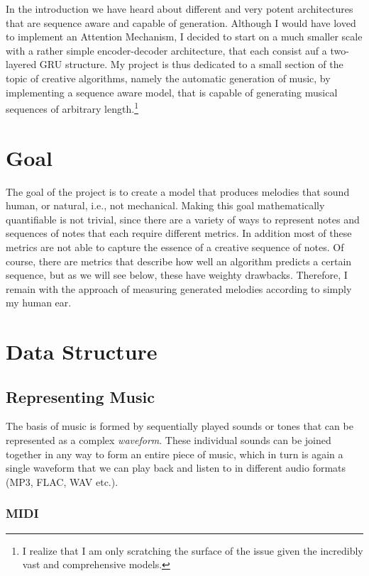 \documentclass[a4paper, 10pt, xcolor=dvipsnames]{article} %
\begin{document}
In the introduction we have heard about different and very potent architectures
that are sequence aware and capable of generation. Although I would have loved
to implement an Attention Mechanism, I decided to start on a much smaller scale
with a rather simple encoder-decoder architecture, that each consist auf a
two-layered GRU structure. My project is thus dedicated to a small section of
the topic of creative algorithms, namely the automatic generation of music, by
implementing a sequence aware model, that is capable of generating musical
sequences of arbitrary length.\footnote{I realize that I am only scratching the
  surface of the issue given the incredibly vast and comprehensive models.}


\section{Goal}
The goal of the project is to create a model that produces melodies that sound
human, or natural, i.e., not mechanical. Making this goal mathematically
quantifiable is not trivial, since there are a variety of ways to represent
notes and sequences of notes that each require different metrics. In addition
most of these metrics are not able to capture the essence of a creative
sequence of notes. Of course, there are metrics that describe how well an
algorithm predicts a certain sequence, but as we will see below, these have
weighty drawbacks. Therefore, I remain with the approach of measuring generated
melodies according to simply my human ear.

\section{Data Structure}

\subsection{Representing Music}

The basis of music is formed by sequentially played sounds or tones that can
be represented as a complex \emph{waveform}. These individual sounds can be joined
together in any way to form an entire piece of music, which in turn is again a
single waveform that we can play back and listen to in different audio
formats (MP3, FLAC, WAV etc.).

\subsubsection{MIDI}
\end{document}
